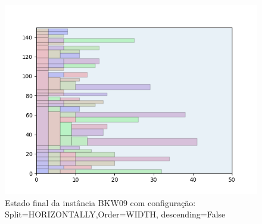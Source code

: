 \begin{figure}[H]
    \centering
    \caption[]{Estado final da instância BKW09 com configuração: Split=HORIZONTALLY,Order=WIDTH, descending=False}
    \label{fig:bkw09-horizontally-width-false}
    \includegraphics[scale=0.5]{output/figures/bkw/bkw09/horizontally/width/false/000}
\end{figure}
